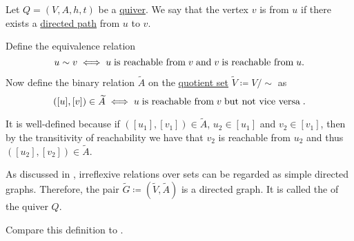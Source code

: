 \begin{definition}\label{def:quiver_condensation}
  Let \( Q = (V, A, h, t) \) be a \hyperref[def:quiver]{quiver}. We say that the vertex \( v \) is  from \( u \) if there exists a \hyperref[def:quiver_path/directed]{directed path} from \( u \) to \( v \).

  Define the equivalence relation
  \begin{equation*}
    u \sim v \iff u \T{is reachable from} v \T{and} v \T{is reachable from} u.
  \end{equation*}

  Now define the binary relation \( \widetilde{A} \) on the \hyperref[def:equivalence_relation/quotient]{quotient set} \( \widetilde{V} \coloneqq V / {\sim} \) as
  \begin{equation*}
    ([u], [v]) \in \widetilde{A} \iff u \T{is reachable from} v \T{but not vice versa}.
  \end{equation*}

  It is well-defined because if \( ([u_1], [v_1]) \in \widetilde{A} \), \( u_2 \in [u_1] \) and \( v_2 \in [v_1] \), then by the transitivity of reachability we have that \( v_2 \) is reachable from \( u_2 \) and thus \( ([u_2], [v_2]) \in \widetilde{A} \).

  As discussed in , irreflexive relations over sets can be regarded as simple directed graphs. Therefore, the pair \( \widetilde{G} \coloneqq (\widetilde{V}, \widetilde{A}) \) is a directed graph. It is called the  of the quiver \( Q \).

  Compare this definition to .
\end{definition}

